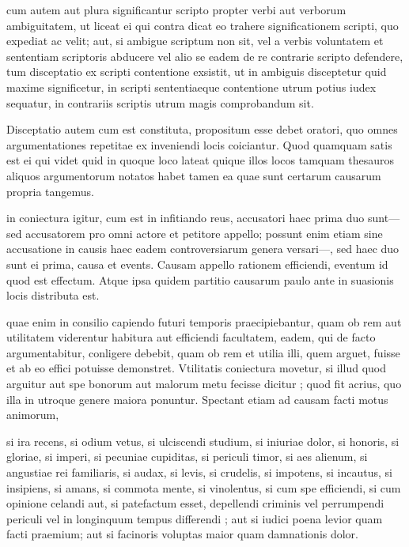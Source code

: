  cum autem aut plura significantur scripto propter verbi aut verborum ambiguitatem, ut liceat ei qui contra dicat eo trahere significationem scripti, quo expediat ac velit; aut, si ambigue scriptum non sit, vel a verbis voluntatem et sententiam scriptoris abducere vel alio se eadem de re contrarie scripto defendere, tum disceptatio ex scripti contentione exsistit, ut in ambiguis disceptetur quid maxime significetur, in scripti sententiaeque contentione utrum potius iudex sequatur, in contrariis scriptis utrum magis comprobandum sit.

 Disceptatio autem cum est constituta, propositum esse debet oratori, quo omnes argumentationes repetitae ex inveniendi locis coiciantur. Quod quamquam satis est ei qui videt quid in quoque loco lateat quique illos locos tamquam thesauros aliquos argumentorum notatos habet tamen ea quae sunt certarum causarum propria tangemus.

 in coniectura igitur, cum est in infitiando reus, accusatori haec prima duo sunt—sed accusatorem pro omni actore et petitore appello; possunt enim etiam sine accusatione in causis haec eadem controversiarum genera versari—, sed haec duo sunt ei prima, causa et events. Causam appello rationem efficiendi, eventum id quod est effectum. Atque ipsa quidem partitio causarum paulo ante in suasionis locis distributa est.

 quae enim in consilio capiendo futuri temporis praecipiebantur, quam ob rem aut utilitatem viderentur habitura aut efficiendi facultatem, eadem, qui de facto argumentabitur, conligere debebit, quam ob rem et utilia illi, quem arguet, fuisse et ab eo effici potuisse demonstret. Vtilitatis coniectura movetur, si illud quod arguitur aut spe bonorum aut malorum metu fecisse dicitur ; quod fit acrius, quo illa in utroque genere maiora ponuntur. Spectant etiam ad causam facti motus animorum,

 si ira recens, si odium vetus, si ulciscendi studium, si iniuriae dolor, si honoris, si gloriae, si imperi, si pecuniae cupiditas, si periculi timor, si aes alienum, si angustiae rei familiaris, si audax, si levis, si crudelis, si impotens, si incautus, si insipiens, si amans, si commota mente, si vinolentus, si cum spe efficiendi, si cum opinione celandi aut, si patefactum esset, depellendi criminis vel perrumpendi periculi vel in longinquum tempus differendi ; aut si iudici poena levior quam facti praemium; aut si facinoris voluptas maior quam damnationis dolor.

